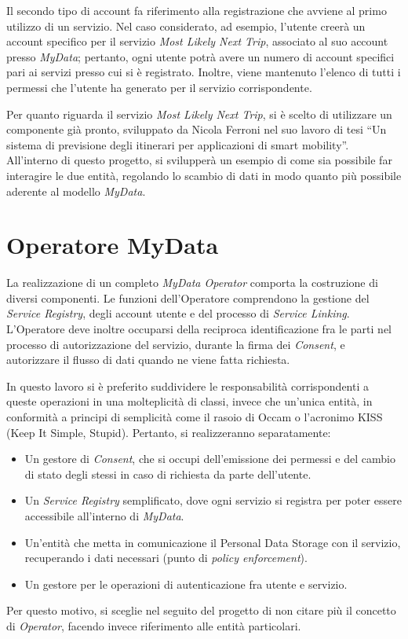 Il secondo tipo di account fa riferimento alla registrazione che avviene al primo utilizzo di un servizio. Nel caso considerato, ad esempio, l’utente creer\`a un account specifico per il servizio \textit{Most Likely Next Trip}, associato al suo account presso \textit{MyData}; pertanto, ogni utente potr\`a avere un numero di account specifici pari ai servizi presso cui si \`e registrato. Inoltre, viene mantenuto l’elenco di tutti i permessi che l’utente ha generato per il servizio corrispondente.

Per quanto riguarda il servizio \textit{Most Likely Next Trip}, si \`e scelto di utilizzare un componente gi\`a pronto, sviluppato da Nicola Ferroni nel suo lavoro di tesi “Un sistema di previsione degli itinerari per applicazioni di smart mobility”\cite{MLNT}.  All’interno di questo progetto, si svilupper\`a un esempio di come sia possibile far interagire le due entit\`a, regolando lo scambio di dati in modo quanto pi\`u possibile aderente al modello \textit{MyData}.

\section{Operatore MyData}
\label{sec:A-mydataop}
\cite{githubmydataoperator}
La realizzazione di un completo \textit{MyData Operator} comporta la costruzione di diversi componenti. Le funzioni dell’Operatore comprendono la gestione del \textit{Service Registry}, degli account utente e del processo di \textit{Service Linking}. L’Operatore deve inoltre occuparsi della reciproca identificazione fra le parti nel processo di autorizzazione del servizio, durante la firma dei \textit{Consent}, e autorizzare il flusso di dati quando ne viene fatta richiesta.

In questo lavoro si \`e preferito suddividere le responsabilit\`a corrispondenti a queste operazioni in una molteplicit\`a di classi, invece che un’unica entit\`a, in conformit\`a a principi di semplicit\`a come il rasoio di Occam o l’acronimo KISS (Keep It Simple, Stupid). Pertanto, si realizzeranno separatamente:
\begin{itemize}
	\item Un gestore di \textit{Consent}, che si occupi dell’emissione dei permessi e del cambio di stato degli stessi in caso di richiesta da parte dell’utente.
	\item Un \textit{Service Registry} semplificato, dove ogni servizio si registra per poter essere accessibile all’interno di \textit{MyData}.
	\item Un’entit\`a che metta in comunicazione il Personal Data Storage con il servizio, recuperando i dati necessari (punto di \textit{policy enforcement}).
	\item Un gestore per le operazioni di autenticazione fra utente e servizio.
\end{itemize}
Per questo motivo, si sceglie nel seguito del progetto di non citare pi\`u il concetto di \textit{Operator}, facendo invece riferimento alle entit\`a particolari.

